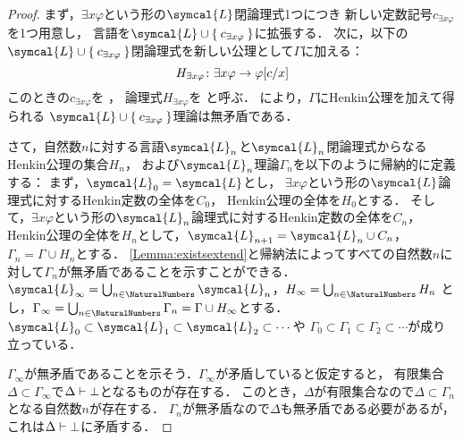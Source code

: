 \begin{proof}
	まず，\(\exists x \varphi\)という形の\(\symcal{L}\)閉論理式1つにつき
	新しい定数記号\(c_{\exists x \varphi}\)を1つ用意し，
	言語を\(\symcal{L} \cup \Set{c_{\exists x \varphi}}\)に拡張する．
	次に，以下の\(\symcal{L} \cup \Set{c_{\exists x \varphi}}\)閉論理式を新しい公理として\(\Gamma\)に加える：
	\begin{equation}
		H_{\exists x \varphi} \colon \exists x \varphi \to \subst{\varphi}{c/x}
		\label{eq:Henkinaxiom}
	\end{equation}
	このときの\(c_{\exists x \varphi}\)を%
	，
	論理式\(H_{\exists x \varphi}\)を%
	と呼ぶ．
	により，\(\Gamma\)にHenkin公理を加えて得られる
	\(\symcal{L} \cup \Set{c_{\exists x \varphi}}\)理論は無矛盾である．

	さて，自然数\(n\)に対する言語\(\symcal{L}_n\)と\(\symcal{L}_n\)閉論理式からなる
	Henkin公理の集合\(H_n\)，
	および\(\symcal{L}_n\)理論\(\Gamma_n\)を以下のように帰納的に定義する：
	まず，\(\symcal{L}_0 = \symcal{L}\)とし，
	\(\exists x \varphi\)という形の\(\symcal{L}\)論理式に対するHenkin定数の全体を\(C_0\)，
	Henkin公理の全体を\(H_0\)とする．
	そして，\(\exists x \varphi\)という形の\(\symcal{L}_n\)論理式に対するHenkin定数の全体を\(C_n\)，
	Henkin公理の全体を\(H_n\)として，\(\symcal{L}_{n+1} = \symcal{L}_n \cup C_n\)，\(\Gamma_n = \Gamma \cup H_n\)とする．
	\cref{Lemma:existsextend}と帰納法によってすべての自然数\(n\)に対して\(\Gamma_n\)が無矛盾であることを示すことができる．
	\(\symcal{L}_\infty = \bigcup_{n \in \NaturalNumbers} \symcal{L}_n\)，\(H_\infty = \bigcup_{n \in \NaturalNumbers} H_n\)
	とし，\(\Gamma_\infty = \bigcup_{n \in \NaturalNumbers} \Gamma_n = \Gamma \cup H_\infty\)とする．
	\(\symcal{L}_0 \subset \symcal{L}_1 \subset \symcal{L}_2 \subset \dotsb\)や
	\(\Gamma_0 \subset\Gamma_1 \subset \Gamma_2 \subset \dotsb\)が成り立っている．

	\(\Gamma_\infty\)が無矛盾であることを示そう．\(\Gamma_\infty\)が矛盾していると仮定すると，
	有限集合\(\Delta \subset \Gamma_\infty\)で\(\Delta \vdash \bot\)となるものが存在する．
	このとき，\(\Delta\)が有限集合なので\(\Delta \subset \Gamma_n\)となる自然数\(n\)が存在する．
	\(\Gamma_n\)が無矛盾なので\(\Delta\)も無矛盾である必要があるが，これは\(\Delta \vdash \bot\)に矛盾する．


\end{proof}
